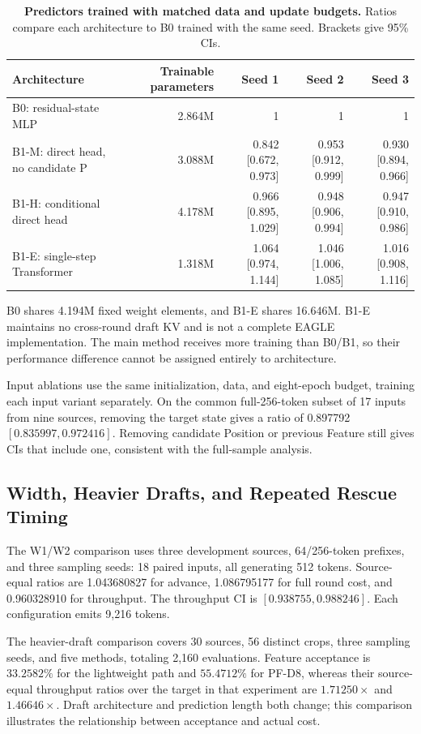 \begin{table}[t]
\centering\small
\caption{\textbf{Predictors trained with matched data and update budgets.} Ratios compare each architecture to B0 trained with the same seed. Brackets give 95\% CIs.}
\label{tab:architecture}
\begin{tabular}{@{}lrrrr@{}}\toprule
Architecture & Trainable parameters & Seed 1 & Seed 2 & Seed 3\\\midrule
B0: residual-state MLP & 2.864M & 1 & 1 & 1\\
B1-M: direct head, no candidate P & 3.088M & 0.842 [0.672, 0.973] & 0.953 [0.912, 0.999] & 0.930 [0.894, 0.966]\\
B1-H: conditional direct head & 4.178M & 0.966 [0.895, 1.029] & 0.948 [0.906, 0.994] & 0.947 [0.910, 0.986]\\
B1-E: single-step Transformer & 1.318M & 1.064 [0.974, 1.144] & 1.046 [1.006, 1.085] & 1.016 [0.908, 1.116]\\\bottomrule
\end{tabular}
\end{table}

B0 shares 4.194M fixed weight elements, and B1-E shares 16.646M. B1-E maintains no cross-round draft KV and is not a complete EAGLE implementation. The main method receives more training than B0/B1, so their performance difference cannot be assigned entirely to architecture.

Input ablations use the same initialization, data, and eight-epoch budget, training each input variant separately. On the common full-256-token subset of 17 inputs from nine sources, removing the target state gives a ratio of 0.897792 $[0.835997,0.972416]$. Removing candidate Position or previous Feature still gives CIs that include one, consistent with the full-sample analysis.

\subsection{Width, Heavier Drafts, and Repeated Rescue Timing}
\label{app:repeat}
The W1/W2 comparison uses three development sources, 64/256-token prefixes, and three sampling seeds: 18 paired inputs, all generating 512 tokens. Source-equal ratios are 1.043680827 for advance, 1.086795177 for full round cost, and 0.960328910 for throughput. The throughput CI is $[0.938755,0.988246]$. Each configuration emits 9,216 tokens.

The heavier-draft comparison covers 30 sources, 56 distinct crops, three sampling seeds, and five methods, totaling 2,160 evaluations. Feature acceptance is $33.2582\%$ for the lightweight path and $55.4712\%$ for PF-D8, whereas their source-equal throughput ratios over the target in that experiment are $1.71250\times$ and $1.46646\times$. Draft architecture and prediction length both change; this comparison illustrates the relationship between acceptance and actual cost.

